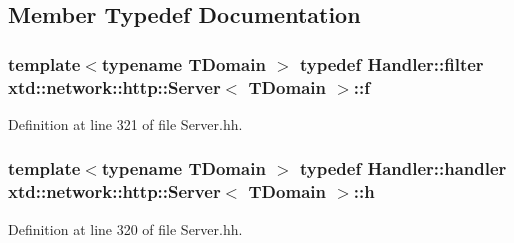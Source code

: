\subsection{Member Typedef Documentation}
\hypertarget{classxtd_1_1network_1_1http_1_1Server_a49f38021cb4d61f2c3027785f8fa561c}{
\subsubsection[{f}]{\setlength{\rightskip}{0pt plus 5cm}template$<$typename T\-Domain $>$ typedef {\bf Handler\-::filter} {\bf xtd\-::network\-::http\-::\-Server}$<$ T\-Domain $>$\-::{\bf f}\hspace{0.3cm}{\ttfamily [protected]}}}\label{classxtd_1_1network_1_1http_1_1Server_a49f38021cb4d61f2c3027785f8fa561c}


Definition at line 321 of file Server.\-hh.

\hypertarget{classxtd_1_1network_1_1http_1_1Server_adfa2951649119f630d33ce9083bd989c}{
\subsubsection[{h}]{\setlength{\rightskip}{0pt plus 5cm}template$<$typename T\-Domain $>$ typedef {\bf Handler\-::handler} {\bf xtd\-::network\-::http\-::\-Server}$<$ T\-Domain $>$\-::{\bf h}\hspace{0.3cm}{\ttfamily [protected]}}}\label{classxtd_1_1network_1_1http_1_1Server_adfa2951649119f630d33ce9083bd989c}


Definition at line 320 of file Server.\-hh.



